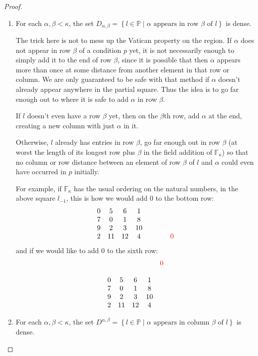\documentclass[12pt,a4paper]{article}
\newcommand{\F}{\mathbb{F}}
\newcommand{\st}{\; | \;}
\newcommand{\set}[2]{\left\{#1\st #2 \right\}}
\renewcommand{\P}{\mathbb{P}}
\begin{document}
\begin{proof}
\begin{enumerate}
	\item For each $\alpha, \beta <\kappa$, the set $D_{\alpha,\beta}=\set{l \in \P}{\alpha \text{ appears in row } \beta \text{ of } l}$ is dense.
	
	The trick here is not to mess up the Vatican property on the region. If $\alpha$ does not appear in row $\beta$ of a condition $p$ yet, it is not necessarily enough to simply add it to the end of row $\beta$, since it is possible that then $\alpha$ appears more than once at some distance from another element in that row or column. We are only guaranteed to be safe with that method if $\alpha$ doesn't already appear anywhere in the partial square. Thus the idea is to go far enough out to where it is safe to add $\alpha$ in row $\beta$.
	
	If $l$ doesn't even have a row $\beta$ yet, then on the $\beta$th row, add $\alpha$ at the end, creating a new column with just $\alpha$ in it.
	
	Otherwise, $l$ already has entries in row $\beta$, go far enough out in row $\beta$ (at worst the length of its longest row plus $\beta$ in the field addition of $\F_\kappa$) so that no column or row distance between an element of row $\beta$ of $l$ and $\alpha$ could even have occurred in $p$ initially.
	
	For example, if $\F_\kappa$ has the usual ordering on the natural numbers, in the above square $l_{-1}$, this is how we would add 0 to the bottom row:
$$\begin{array}{cccccccc}
	0 & 5 & 6 & 1 \\ 
	7 &  0 & 1 & 8  \\
	9 & 2 & 3 & 10 \\
	2 & 11 & 12 & 4 & & & & \color{red}0
\end{array}$$
and if we would like to add 0 to the sixth row:
$$\begin{array}{ccccccc}
	 & & & & \color{red} 0\\
	 &  & & \\
	0 & 5 & 6 & 1 \\ 
	7 &  0 & 1 & 8 \\
	9 & 2 & 3 & 10 \\
	2 & 11 & 12 & 4
\end{array}$$

	
	\item For each $\alpha, \beta <\kappa$, the set $D^{\alpha,\beta}=\set{l \in \P}{\alpha \text{ appears in column } \beta \text{ of } l}$ is dense.
	

\end{enumerate}
\end{proof}
\end{document}
